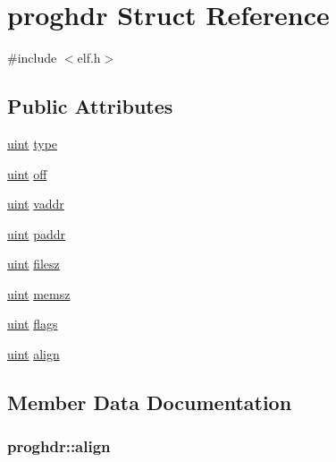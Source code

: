 \hypertarget{structproghdr}{}\section{proghdr Struct Reference}
\label{structproghdr}


{\ttfamily \#include $<$elf.\+h$>$}

\subsection*{Public Attributes}
\begin{DoxyCompactItemize}
\item 
\hyperlink{custom__types_8h_a91ad9478d81a7aaf2593e8d9c3d06a14}{uint} \hyperlink{structproghdr_a42ea22dcdaa75a9cbdf7cd366b85e9ea}{type}
\item 
\hyperlink{custom__types_8h_a91ad9478d81a7aaf2593e8d9c3d06a14}{uint} \hyperlink{structproghdr_a979532386fd448596cc5046339a2cd2d}{off}
\item 
\hyperlink{custom__types_8h_a91ad9478d81a7aaf2593e8d9c3d06a14}{uint} \hyperlink{structproghdr_a6fa1051e19935bbedc5eaf086f5330b4}{vaddr}
\item 
\hyperlink{custom__types_8h_a91ad9478d81a7aaf2593e8d9c3d06a14}{uint} \hyperlink{structproghdr_af65905aa5c4ccb33aac7dad5783e14d9}{paddr}
\item 
\hyperlink{custom__types_8h_a91ad9478d81a7aaf2593e8d9c3d06a14}{uint} \hyperlink{structproghdr_a95dee0f1864ec1602f1ff6998ac00df0}{filesz}
\item 
\hyperlink{custom__types_8h_a91ad9478d81a7aaf2593e8d9c3d06a14}{uint} \hyperlink{structproghdr_a9f703ade191af1054b3de797d8167d89}{memsz}
\item 
\hyperlink{custom__types_8h_a91ad9478d81a7aaf2593e8d9c3d06a14}{uint} \hyperlink{structproghdr_ab3ad45ccf4b38dec384206ecbd099076}{flags}
\item 
\hyperlink{custom__types_8h_a91ad9478d81a7aaf2593e8d9c3d06a14}{uint} \hyperlink{structproghdr_a9a7d455ad6830cd1a37aa324911880ec}{align}
\end{DoxyCompactItemize}


\subsection{Member Data Documentation}
\subsubsection[{\texorpdfstring{align}{align}}]{ proghdr\+::align}\hypertarget{structproghdr_a9a7d455ad6830cd1a37aa324911880ec}{}\label{structproghdr_a9a7d455ad6830cd1a37aa324911880ec}
